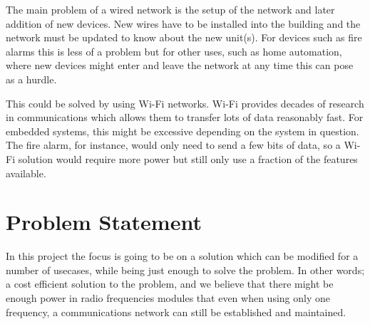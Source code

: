 The main problem of a wired network is the setup of the network and later addition of new devices. 
New wires have to be installed into the building and the network must be updated to know about the new unit(s).
For devices such as fire alarms this is less of a problem but for other uses, such as home automation, where new devices might enter and leave the network at any time this can pose as a hurdle.

This could be solved by using Wi-Fi networks.
Wi-Fi provides decades of research in communications which allows them to transfer lots of data reasonably fast.
For embedded systems, this might be excessive depending on the system in question.
The fire alarm, for instance, would only need to send a few bits of data, so a Wi-Fi solution would require more power but still only use a fraction of the features available.






\section{Problem Statement}\label{sec:problemStatement}

In this project the focus is going to be on a solution which can be modified for a number of usecases, while being just enough to solve the problem.
In other words; a cost efficient solution to the problem, and we believe that there might be enough power in radio frequencies modules that even when using only one frequency, a communications network can still be established and maintained.


